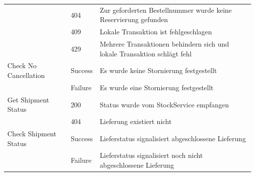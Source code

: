 \begin{center}
\begin{longtable}[h]{|p{3cm}|p{1.5cm}|p{11cm}|}
							& 404		& Zur geforderten Bestellnummer wurde keine Reservierung gefunden \\
							& 409		& Lokale Transaktion ist fehlgeschlagen \\
							& 429 		& Mehrere Transaktionen behindern sich und lokale Transaktion schlägt fehl \\ \hline
		Check No Cancellation 	& Success	& Es wurde keine Stornierung festgestellt \\
							& Failure	& Es wurde eine Stornierung festgestellt \\ \hline
		Get Shipment Status	& 200 		& Status wurde vom StockService empfangen \\
							& 404		& Lieferung existiert nicht \\ \hline
		Check Shipment Status & Success	& Lieferstatus signalisiert abgeschlossene Lieferung \\
							& Failure 	& Lieferstatus signalisiert noch nicht abgeschlossene Lieferung \\ \hline
	\end{longtable}
\end{center}
\FloatBarrier

